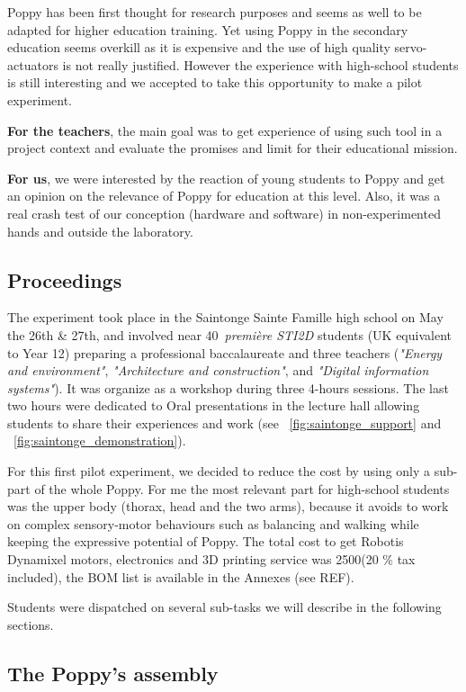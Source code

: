 Poppy has been first thought for research purposes and seems as well to be adapted for higher education training. Yet using Poppy in the secondary education seems overkill as it is expensive and the use of high quality servo-actuators is not really justified. However the experience with high-school students is still interesting and we accepted to take this opportunity to make a pilot experiment.

\textbf{For the teachers}, the main goal was to get experience of using such tool in a project context and evaluate the promises and limit for their educational mission.

\textbf{For us}, we were interested by the reaction of young students to Poppy and get an opinion on the relevance of Poppy for education at this level. Also, it was a real crash test of our conception (hardware and software) in non-experimented hands and outside the laboratory.

\subsection{Proceedings} %

The experiment took place in the Saintonge Sainte Famille high school on May the 26th \& 27th, and involved near 40~\emph{première STI2D} students (UK equivalent to Year 12) preparing a professional baccalaureate and three teachers (\emph{"Energy and environment"}, \emph{"Architecture and construction"}, and \emph{"Digital information systems"}).
It was organize as a workshop during three 4-hours sessions. The last two hours were dedicated to Oral presentations in the lecture hall allowing students to share their experiences and work (see \figurename~\ref{fig:saintonge_support} and \figurename~\ref{fig:saintonge_demonstration}).

For this first pilot experiment, we decided to reduce the cost by using only a sub-part of the whole Poppy. For me the most relevant part for high-school students was the upper body (thorax, head and the two arms), because it avoids to work on complex sensory-motor behaviours such as balancing and walking while keeping the expressive potential of Poppy. The total cost to get Robotis Dynamixel motors, electronics and 3D printing service was 2500\texteuro (20 \% tax included), the BOM list is available in the Annexes (see REF).


Students were dispatched on several sub-tasks we will describe in the following sections.


\subsection{The Poppy's assembly} %


